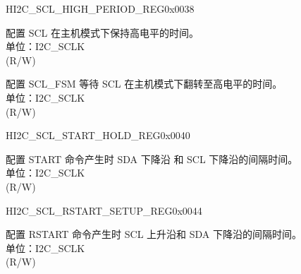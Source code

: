 \begin{register}{H}{I2C\_SCL\_HIGH\_PERIOD\_REG}{0x0038}\label{regdesc:I2CSCLHIGHPERIODREG}
%
%
%
\regnewline%
\begin{regdesc}\begin{reglist}
\label{fielddesc:I2CSCLHIGHPERIOD}\item [I2C\_SCL\_HIGH\_PERIOD] 配置 SCL 在主机模式下保持高电平的时间。\\
单位：I2C\_SCLK \\ (R/W)
\label{fielddesc:I2CSCLWAITHIGHPERIOD}\item [I2C\_SCL\_WAIT\_HIGH\_PERIOD] 配置 SCL\_FSM 等待 SCL 在主机模式下翻转至高电平的时间。\\
单位：I2C\_SCLK \\ (R/W)
\end{reglist}\end{regdesc}
\end{register}


\begin{register}{H}{I2C\_SCL\_START\_HOLD\_REG}{0x0040}\label{regdesc:I2CSCLSTARTHOLDREG}
%
%
\regnewline%
\begin{regdesc}\begin{reglist}
\label{fielddesc:I2CSCLSTARTHOLDTIME}\item [I2C\_SCL\_START\_HOLD\_TIME] 配置 START 命令产生时 SDA 下降沿 和 SCL 下降沿的间隔时间。\\
单位：I2C\_SCLK \\ (R/W)
\end{reglist}\end{regdesc}
\end{register}


\begin{register}{H}{I2C\_SCL\_RSTART\_SETUP\_REG}{0x0044}\label{regdesc:I2CSCLRSTARTSETUPREG}
%
%
\regnewline%
\begin{regdesc}\begin{reglist}
\label{fielddesc:I2CSCLRSTARTSETUPTIME}\item [I2C\_SCL\_RSTART\_SETUP\_TIME] 配置 RSTART 命令产生时 SCL 上升沿和 SDA 下降沿的间隔时间。\\
单位：I2C\_SCLK \\ (R/W)
\end{reglist}\end{regdesc}
\end{register}


